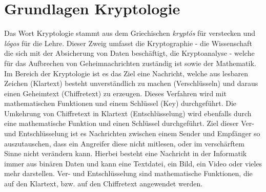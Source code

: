 \documentclass[10pt, a4paper,headsepline]{scrreprt}
\begin{document}
\chapter{Grundlagen Kryptologie}
Das Wort Kryptologie stammt aus dem Griechischen \textit{kryptós} für verstecken und \textit{lógos} für die Lehre.%
Dieser Zweig umfasst die Kryptographie - die Wissenschaft die sich mit der Absicherung von Daten beschäftigt, die Kryptoanalyse - welche für das Aufbrechen von Geheimnachrichten zuständig ist sowie der Mathematik.
Im Bereich der Kryptologie ist es das Ziel eine Nachricht, welche aus lesbaren Zeichen (Klartext) besteht unverständlich zu machen (Verschlüsseln) und daraus einen Geheimtext (Chiffretext) zu erzeugen. Dieses Verfahren wird mit mathematischen Funktionen und einem Schlüssel (Key) durchgeführt. Die Umkehrung von Chiffretext in Klartext (Entschlüsselung) wird ebenfalls durch eine mathematische Funktion und einen Schlüssel durchgeführt. Ziel dieser Ver- und Entschlüsselung ist es Nachrichten zwischen einem Sender und Empfänger so auszutauschen, dass ein Angreifer diese nicht mitlesen, oder im verschärftem Sinne nicht verändern kann. Hierbei besteht eine Nachricht in der Informatik immer aus binären Daten und kann eine Textdatei, ein Bild, ein Video oder vieles mehr darstellen. Ver- und Entschlüsselung sind mathematische Funktionen, die auf den Klartext, bzw. auf den Chiffretext angewendet werden. 
\end{document}
